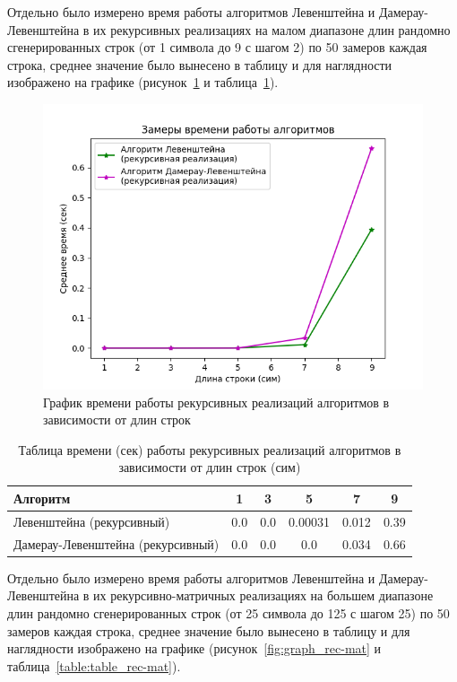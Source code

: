Отдельно было измерено время работы алгоритмов Левенштейна и Дамерау-Левенштейна в их рекурсивных реализациях на малом диапазоне длин рандомно сгенерированных строк (от 1 символа до 9 с шагом 2) по 50 замеров каждая строка, среднее значение было вынесено в таблицу и для наглядности изображено на графике (рисунок~\ref{fig:graph_rec} и таблица~\ref{table:table_rec}).

\begin{figure}[H]
    \centering
    \includegraphics[width=1\textwidth]{img/graph_rec.png}
    \caption{График времени работы рекурсивных реализаций алгоритмов в зависимости от длин строк}
    \label{fig:graph_rec}
\end{figure}

\begin{table}[H]
    \centering
    \begin{tabular}{|l|c|c|c|c|c|}
        \hline
        \textbf{Алгоритм} & \textbf{1} & \textbf{3} & \textbf{5} & \textbf{7} & \textbf{9}\\
        \hline
        Левенштейна (рекурсивный) & 0.0 & 0.0 & 0.00031 & 0.012 & 0.39 \\
        Дамерау-Левенштейна (рекурсивный) &  0.0 & 0.0 & 0.0 & 0.034 & 0.66  \\
        \hline
    \end{tabular}
    \caption{Таблица времени (сек) работы рекурсивных реализаций алгоритмов в зависимости от длин строк (сим)}
    \label{table:table_rec}
\end{table}

Отдельно было измерено время работы алгоритмов Левенштейна и Дамерау-Левенштейна в их рекурсивно-матричных реализациях на большем диапазоне длин рандомно сгенерированных строк (от 25 символа до 125 с шагом 25) по 50 замеров каждая строка, среднее значение было вынесено в таблицу и для наглядности изображено на графике (рисунок~\ref{fig:graph_rec-mat} и таблица~\ref{table:table_rec-mat}).

